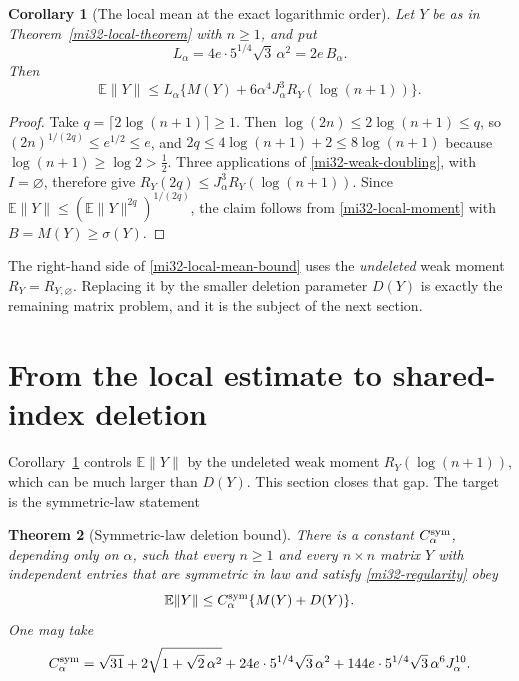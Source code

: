 \documentclass[11pt]{article}
\newtheorem{theorem}{Theorem}[section]
\newtheorem{corollary}[theorem]{Corollary}
\theoremstyle{definition}
\theoremstyle{remark}
\newcommand{\E}{\mathbb E}
\newcommand{\norm}[1]{\lVert#1\rVert}
\begin{document}
\begin{corollary}[The local mean at the exact logarithmic order]
\label{mi32-local-mean}
Let $Y$ be as in Theorem~\ref{mi32-local-theorem} with $n\ge1$, and put
\begin{equation}\label{mi32-L-constant}
 L_\alpha=4e\cdot5^{1/4}\sqrt3\,\alpha^2=2e\,B_\alpha .
\end{equation}
Then
\begin{equation}\label{mi32-local-mean-bound}
 \E\norm{Y}\le L_\alpha
    \bigl\{M(Y)+6\alpha^4J_\alpha^3R_Y(\log(n+1))\bigr\}.
\end{equation}
\end{corollary}
\begin{proof}
Take $q=\lceil2\log(n+1)\rceil\ge1$. Then
$\log(2n)\le2\log(n+1)\le q$, so $(2n)^{1/(2q)}\le e^{1/2}\le e$, and
$2q\le4\log(n+1)+2\le8\log(n+1)$ because
$\log(n+1)\ge\log2>\tfrac12$. Three applications of
\eqref{mi32-weak-doubling}, with $I=\varnothing$, therefore give
$R_Y(2q)\le J_\alpha^3R_Y(\log(n+1))$. Since
$\E\norm{Y}\le(\E\norm{Y}^{2q})^{1/(2q)}$, the claim follows from
\eqref{mi32-local-moment} with $B=M(Y)\ge\sigma(Y)$.
\end{proof}

The right-hand side of \eqref{mi32-local-mean-bound} uses the
\emph{undeleted} weak moment $R_Y=R_{Y,\varnothing}$. Replacing it by
the smaller deletion parameter $D(Y)$ is exactly the remaining matrix
problem, and it is the subject of the next section.
\section{From the local estimate to shared-index deletion}
\label{mi32-reduction-section}

Corollary~\ref{mi32-local-mean} controls $\E\norm{Y}$ by the undeleted
weak moment $R_Y(\log(n+1))$, which can be much larger than $D(Y)$.
This section closes that gap. The target is the symmetric-law statement

\begin{theorem}[Symmetric-law deletion bound]
\label{mi32-symmetric-deletion}
There is a constant $C^{\rm sym}_\alpha$, depending only on $\alpha$,
such that every $n\ge1$ and every $n\times n$ matrix $Y$ with
independent entries that are symmetric in law and satisfy
\eqref{mi32-regularity} obey
\begin{equation}\label{mi32-symmetric-deletion-bound}
 \E\norm{Y}\le C^{\rm sym}_\alpha\{M(Y)+D(Y)\}.
\end{equation}
One may take
\begin{equation}\label{mi32-Csym}
 C^{\rm sym}_\alpha
 =\sqrt{31}+2\sqrt{1+\sqrt2\,\alpha^2}
   +24e\cdot5^{1/4}\sqrt3\,\alpha^2
   +144e\cdot5^{1/4}\sqrt3\,\alpha^6J_\alpha^{10}.
\end{equation}
\end{theorem}
\end{document}
